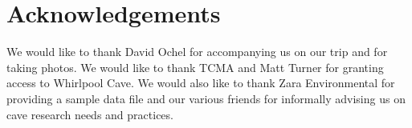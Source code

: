\documentclass[10pt,twocolumn]{article}
\begin{document}
\section{Acknowledgements}
We would like to thank David Ochel for accompanying us on our trip and for taking photos. 
We would like to thank TCMA and Matt Turner for granting access to Whirlpool Cave. 
We would also like to thank Zara Environmental for providing a sample data file
and our various friends for informally advising us on cave research needs and practices.

% 



\end{document}
